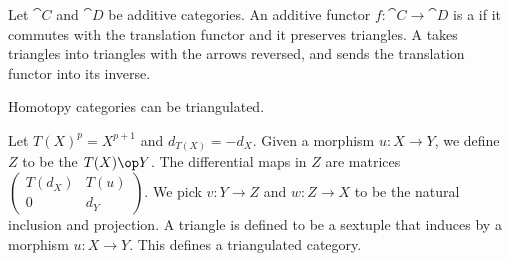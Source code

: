\begin{definition}
\begin{enumerate}
\begin{center}
        \end{center}
    \end{enumerate}
\end{definition}
\begin{definition}
    Let $\cat{C}$ and $\cat{D}$ be additive categories. An additive functor $f:\cat{C}\to\cat{D}$ is a  if it commutes with the translation functor and it preserves triangles. A  takes triangles into triangles with the arrows reversed, and sends the translation functor into its inverse.
\end{definition}
\par
Homotopy categories can be triangulated.
\begin{proposition}
    Let $T{(X)}^{p}={X}^{p+1}$ and ${d}_{T(X)}=-{d}_{X}$. Given a morphism $u:X\to Y$, we define $Z$ to be the  $T(X)\op Y$. The differential maps in $Z$ are matrices $\begin{pmatrix}
        T({d}_{X}) & T(u) \\
        0 & {d}_{Y}
    \end{pmatrix}$. We pick $v:Y\to Z$ and $w:Z\to X$ to be the natural inclusion and projection. A triangle is defined to be a sextuple that induces by a morphism $u:X\to Y$. This defines a triangulated category.
\end{proposition}
